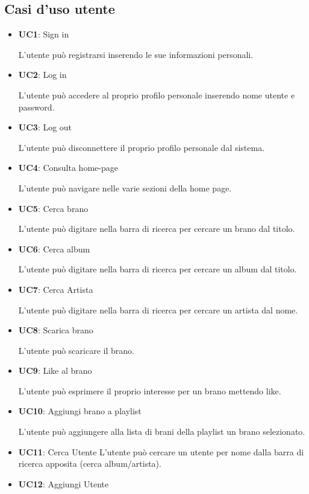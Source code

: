 \subsection{Casi d'uso utente}
\begin{itemize}
      \item \textbf{UC1}: Sign in 
            
      L'utente può registrarsi inserendo le sue informazioni
            personali.
      \item \textbf{UC2}: Log in 
      
      L'utente può accedere al proprio profilo personale
            inserendo nome utente e password.
      \item \textbf{UC3}: Log out 
      
      L'utente può disconnettere il proprio profilo personale
            dal sistema.
      \item \textbf{UC4}: Consulta home-page
      
      L'utente può navigare nelle varie sezioni
            della home page.
      \item \textbf{UC5}: Cerca brano 
      
      L'utente può digitare nella barra di ricerca per cercare un brano dal titolo.
      \item \textbf{UC6}: Cerca album
      
      L'utente può digitare nella barra di ricerca per cercare un album dal titolo.
      \item \textbf{UC7}: Cerca Artista
      
      L'utente può digitare nella barra di ricerca per cercare un artista dal nome.
      
      
      \item \textbf{UC8}: Scarica brano 
      
      L'utente può scaricare il brano.
      \item \textbf{UC9}: Like al brano 
      
      L'utente può esprimere il proprio interesse per un brano mettendo like.
      \item \textbf{UC10}: Aggiungi brano a playlist
      
      L'utente può aggiungere alla lista di brani della playlist un brano selezionato.
      \item \textbf{UC11}: Cerca Utente L'utente può cercare un utente per nome dalla barra
            di ricerca apposita (cerca album/artista).
      \item \textbf{UC12}: Aggiungi Utente 
      

\end{itemize}
